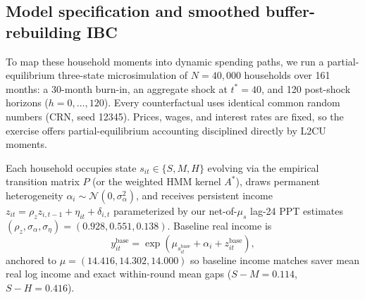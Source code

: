 \documentclass[11pt]{article}
\begin{document}
\subsection{Model specification and smoothed buffer-rebuilding IBC}\label{sec:modelspec}

To map these household moments into dynamic spending paths, we run a partial-equilibrium three-state microsimulation of $N = 40{,}000$ households over 161 months: a 30-month burn-in, an aggregate shock at $t^* = 40$, and 120 post-shock horizons ($h = 0, \dots, 120$). Every counterfactual uses identical common random numbers (CRN, seed 12345). Prices, wages, and interest rates are fixed, so the exercise offers partial-equilibrium accounting disciplined directly by L2CU moments.

Each household occupies state $s_{it} \in \{S, M, H\}$ evolving via the empirical transition matrix $P$ (or the weighted HMM kernel $A^*$), draws permanent heterogeneity $\alpha_i \sim \mathcal{N}(0, \sigma_\alpha^2)$, and receives persistent income $z_{it} = \rho_z z_{i,t-1} + \eta_{it} + \delta_{i,t}$ parameterized by our net-of-$\mu_s$ lag-24 PPT estimates $(\rho_z, \sigma_\alpha, \sigma_\eta) = (0.928, 0.551, 0.138)$. Baseline real income is
\begin{equation}\label{eq:income_sim}
y_{it}^{\text{base}} = \exp\!\left(\mu_{s_{it}^{\text{base}}} + \alpha_i + z_{it}^{\text{base}}\right),
\end{equation}
anchored to $\mu = (14.416, 14.302, 14.000)$ so baseline income matches saver mean real log income and exact within-round mean gaps ($S - M = 0.114$, $S - H = 0.416$).
\end{document}
